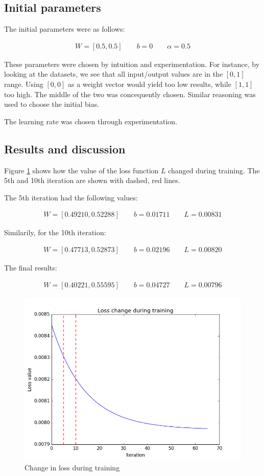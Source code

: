 \documentclass[paper=a4, fontsize=11pt]{scrartcl} %
\numberwithin{equation}{section} %
\numberwithin{figure}{section} %
\numberwithin{table}{section} %
\begin{document}
\subsection{Initial parameters}

The initial parameters were as follows:

\begin{gather*}
    W = [0.5, 0.5] \qquad b = 0 \qquad \alpha = 0.5 
\end{gather*}

These parameters were chosen by intuition and experimentation.
For instance, by looking at the datasets, we see that all input/output values are in the $[0, 1]$ range.
Using $[0, 0]$ as a weight vector would yield too low results, while $[1, 1]$ too high.
The middle of the two was concequently chosen.
Similar reasoning was used to choose the initial bias.

The learning rate was chosen through experimentation.

\subsection{Results and discussion}

Figure \ref{fig:loss-change} shows how the value of the loss function $L$ changed during training.
The 5th and 10th iteration are shown with dashed, red lines.

The 5th iteration had the following values:

\begin{gather*}
    W = [0.49210, 0.52288] \qquad b = 0.01711 \qquad L = 0.00831
\end{gather*}

Similarily, for the 10th iteration:

\begin{gather*}
    W = [0.47713, 0.52873] \qquad b = 0.02196 \qquad L = 0.00820
\end{gather*}

The final results:

\begin{gather*}
    W = [0.40221, 0.55595] \qquad b = 0.04727 \qquad L = 0.00796
\end{gather*}


\begin{figure}[H]
    \centering
    \includegraphics[width=0.8\linewidth]{img/loss-change.png}
    \caption{Change in loss during training} \label{fig:loss-change}
\end{figure}
\end{document}

